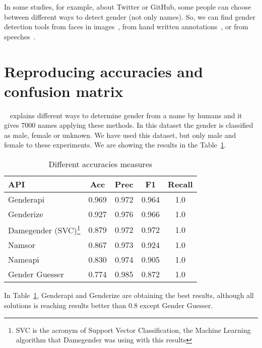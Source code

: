 \documentclass[a4paper]{article}
\begin{document}
In some studies, for example, about Twitter or GitHub, some people can choose between different ways to detect gender (not only names). 
So, we can find gender detection tools from faces in images~\cite{ranjan2017hyperface}, from hand written annotations~\cite{liwicki2011automatic}, or from speeches~\cite{koppel2002automatically}.


\section{Reproducing accuracies and confusion matrix}

~\cite{10.7717/peerj-cs.156} explains different ways to determine gender from a name by humans and it gives 7000 names applying these methods. 
In this dataset the gender is classified as male, female or unknown. 
We have used this dataset, but only male and female to these experiments.
We are showing the results in the Table~\ref{table:DifferentAccuraciesMeasures}.

\begin{table}
\footnotesize
\begin{tabular}[]{lcccc}
  \hline
  API & Acc & Prec & F1 & Recall\tabularnewline
\hline
Genderapi & 0.969 & 0.972 & 0.964 & 1.0\tabularnewline
Genderize & 0.927 & 0.976 & 0.966 & 1.0\tabularnewline
Damegender (SVC)\footnote{SVC is the acronym of Support Vector Classification, the Machine Learning algorithm that Damegender was using with this results} & 0.879 & 0.972 & 0.972 & 1.0\tabularnewline
Namsor & 0.867 & 0.973 & 0.924 & 1.0\tabularnewline
Nameapi & 0.830 & 0.974 & 0.905 & 1.0\tabularnewline
Gender Guesser & 0.774 & 0.985 & 0.872 & 1.0\tabularnewline
\hline
\end{tabular}
\caption{Different accuracies measures}
\label{table:DifferentAccuraciesMeasures}
\end{table}

In Table~\ref{table:DifferentAccuraciesMeasures}, Genderapi and Genderize are obtaining the best results, although all solutions is reaching results better than 0.8 except Gender Guesser.
\end{document}
